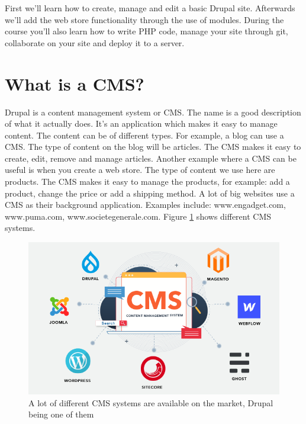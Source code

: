 First we’ll learn how to create, manage and edit a basic Drupal site. Afterwards we’ll add the web store functionality through the use of modules. During the course you’ll also learn how to write PHP code, manage your site through git, collaborate on your site and deploy it to a server.

\section{What is a CMS?}
Drupal is a content management system or CMS. The name is a good description of what it actually does. It’s an application which makes it easy to manage content. The content can be of different types. For example, a blog can use a CMS. The type of content on the blog will be articles. The CMS makes it easy to create, edit, remove and manage articles. Another example where a CMS can be useful is when you create a web store. The type of content we use here are products. The CMS makes it easy to manage the products, for example: add a product, change the price or add a shipping method.
A lot of big websites use a CMS as their background application. Examples include: www.engadget.com, www.puma.com, www.societegenerale.com. Figure \ref{fig:cms_systems} shows different CMS systems.

\begin{figure}[h]
    \centering
    \includegraphics[width=1\linewidth]{img/ch1/cms_systems}
    \caption{A lot of different CMS systems are available on the market, Drupal being one of them \cite{HubSpot2022}}
    \label{fig:cms_systems}
\end{figure}



